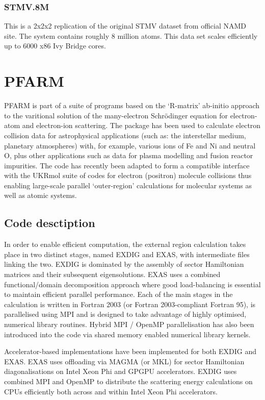 \subsubsection{STMV.8M}
This is a 2x2x2 replication of the original STMV dataset from official NAMD site. The system contains roughly 8 million atoms. This data set scales efficiently up to 6000 x86 Ivy Bridge cores.

\section{PFARM}
PFARM is part of a suite of programs based on the ‘R-matrix’ ab-initio approach to the varitional solution of the many-electron Schrödinger equation for electron-atom and electron-ion scattering. The package has been used to calculate electron collision data for astrophysical applications (such as: the interstellar medium, planetary atmospheres) with, for example, various ions of Fe and Ni and neutral O, plus other applications such as data for plasma modelling and fusion reactor impurities. The code has recently been adapted to form a compatible interface with the UKRmol suite of codes for electron (positron) molecule collisions thus enabling large-scale parallel ‘outer-region’ calculations for molecular systems as well as atomic systems.

\subsection{Code desctiption}
In order to enable efficient computation, the external region calculation takes place in two distinct stages, named EXDIG and EXAS, with intermediate files linking the two. EXDIG is dominated by the assembly of sector Hamiltonian matrices and their subsequent eigensolutions. EXAS uses a combined functional/domain decomposition approach where good load-balancing is essential to maintain efficient parallel performance. Each of the main stages in the calculation is written in Fortran 2003 (or Fortran 2003-compliant Fortran 95), is parallelised using MPI and is designed to take advantage of highly optimised, numerical library routines. Hybrid MPI / OpenMP parallelisation has also been introduced into the code via shared memory enabled numerical library kernels.

Accelerator-based implementations have been implemented for both EXDIG and EXAS. EXAS uses offloading via MAGMA (or MKL) for sector Hamiltonian diagonalisations on Intel Xeon Phi and GPGPU accelerators. EXDIG uses combined MPI and OpenMP to distribute the scattering energy calculations on CPUs efficiently both across and within Intel Xeon Phi accelerators.

